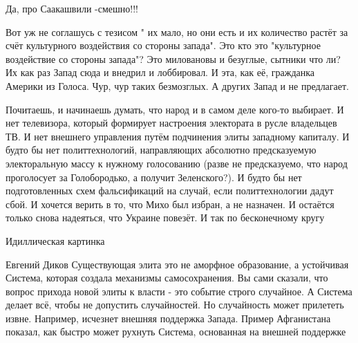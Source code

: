 \begin{itemize}
\begin{itemize}
Да, про Саакашвили -смешно!!!
\end{itemize}

 

Вот уж не соглашусь с тезисом " их мало, но они есть и их количество растёт за счёт культурного воздействия со стороны запада".
Это кто это "культурное воздействие со стороны запада"?
Это миловановы и безуглые, сытники что ли?
Их как раз Запад сюда и внедрил и лоббировал. И эта, как её, гражданка Америки из Голоса.
Чур, чур таких безмозглых.
А других Запад и не предлагает.

 

Почитаешь, и начинаешь думать, что народ и в самом деле кого-то выбирает. И нет
телевизора, который формирует настроения электората в русле владельцев ТВ. И
нет внешнего управления путём подчинения элиты западному капиталу. И будто бы
нет политтехнологий, направляющих абсолютно предсказуемую электоральную массу к
нужному голосованию (разве не предсказуемо, что народ проголосует за
Голобородько, а получит Зеленского?). И будто бы нет подготовленных схем
фальсификаций на случай, если политтехнологии дадут сбой. И хочется верить в
то, что Михо был избран, а не назначен. И остаётся только снова надеяться, что
Украине повезёт. И так по бесконечному кругу

Идиллическая картинка

Евгений Диков
Существующая элита это не аморфное образование, а устойчивая Система, которая создала механизмы самосохранения. Вы сами сказали, что вопрос прихода новой элиты к власти - это событие строго случайное. А Система делает всё, чтобы не допустить случайностей. Но случайность может прилететь извне. Например, исчезнет внешняя поддержка Запада. Пример Афганистана показал, как быстро может рухнуть Система, основанная на внешней поддержке

 

\end{itemize}
